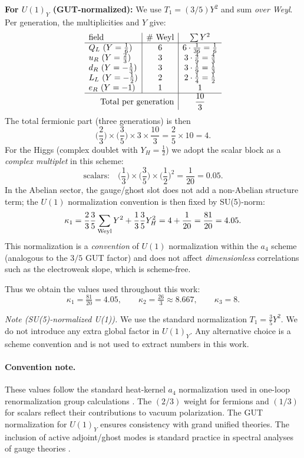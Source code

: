 \documentclass{article}
\numberwithin{equation}{section}
\theoremstyle{plain}
\theoremstyle{definition}
\theoremstyle{remark}
\begin{document}
\textbf{For $U(1)_Y$ (GUT-normalized):}
We use $T_1=(3/5)Y^2$ and sum \emph{over Weyl}. Per generation, the multiplicities and $Y$ give:
\[
\begin{array}{l|c|c}
\text{field} & \#~\text{Weyl} & \sum Y^2 \\
\hline
Q_L~(Y=\tfrac{1}{6}) & 6 & 6\cdot \tfrac{1}{36}=\tfrac{1}{6} \\
u_R~(Y=\tfrac{2}{3}) & 3 & 3\cdot \tfrac{4}{9}=\tfrac{4}{3} \\
d_R~(Y=-\tfrac{1}{3}) & 3 & 3\cdot \tfrac{1}{9}=\tfrac{1}{3} \\
L_L~(Y=-\tfrac{1}{2}) & 2 & 2\cdot \tfrac{1}{4}=\tfrac{1}{2} \\
e_R~(Y=-1) & 1 & 1 \\
\hline
\multicolumn{2}{r|}{\text{Total per generation}} & \displaystyle \frac{10}{3}
\end{array}
\]
The total fermionic part (three generations) is then
\[
\Big(\frac{2}{3}\Big)\!\times\!\Big(\frac{3}{5}\Big)\!\times\! 3\!\times\!\frac{10}{3}
=\frac{2}{5}\times 10 = 4.
\]
For the Higgs (complex doublet with $Y_H=\tfrac{1}{2}$) we adopt the scalar block as a \emph{complex multiplet} in this scheme:
\[
\text{scalars:}\quad \Big(\frac{1}{3}\Big)\!\times\!\Big(\frac{3}{5}\Big)\!\times\!\Big(\frac{1}{2}\Big)^{\!2}=\frac{1}{20}=0.05.
\]
In the Abelian sector, the gauge/ghost slot does not add a non-Abelian structure term; the $U(1)$ normalization convention is then fixed by SU(5)-norm:
\[
\kappa_1 = \frac{2}{3}\frac{3}{5}\sum_{\rm Weyl} Y^2 + \frac{1}{3}\frac{3}{5} Y_H^2 = 4 + \frac{1}{20} = \frac{81}{20} = 4.05.
\]
This normalization is a \emph{convention} of $U(1)$ normalization within the $a_4$ scheme (analogous to the $3/5$ GUT factor) and does not affect \emph{dimensionless} correlations such as the electroweak slope, which is scheme-free.

Thus we obtain the values used throughout this work:
\begin{equation}
\boxed{\kappa_1=\tfrac{81}{20}=4.05,\qquad \kappa_2=\tfrac{26}{3}\approx 8.667,\qquad \kappa_3=8.}
\label{eq:kappas}
\end{equation}

\emph{Note (SU(5)-normalized U(1)).} We use the standard normalization $T_1=\frac{3}{5}Y^2$. We do not introduce any extra global factor in $U(1)_Y$. Any alternative choice is a scheme convention and is not used to extract numbers in this work.

\footnotesize
\paragraph{Convention note.}
These values follow the standard heat-kernel $a_4$ normalization used in one-loop renormalization group calculations \cite{Machacek1983,Machacek1984}. The $(2/3)$ weight for fermions and $(1/3)$ for scalars reflect their contributions to vacuum polarization. The GUT normalization for $U(1)_Y$ ensures consistency with grand unified theories. The inclusion of active adjoint/ghost modes is standard practice in spectral analyses of gauge theories \cite{Vassilevich2003}.
\end{document}
